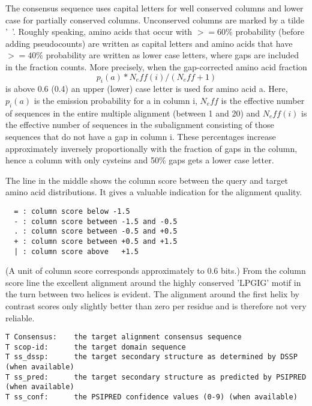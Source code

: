 \documentclass[11pt,a4paper]{article}
\begin{document}
The consensus sequence uses capital letters for well conserved columns and
lower case for partially conserved columns. Unconserved columns are marked by 
a tilde '~'. Roughly speaking, amino acids that occur with $>=60\%$ probability 
(before adding pseudocounts) are written as capital letters and amino acids that have 
$>=40\%$ probability are written as lower case letters, where gaps are included
in the fraction counts. More precisely, when the gap-corrected amino acid fraction
    \[p_i(a)*N_eff(i)/(N_eff+1)\]
is above 0.6 (0.4) an upper (lower) case letter is used for amino acid a.
Here, $p_i(a)$ is the emission probability for a in column i, $N_eff$ is the effective 
number of sequences in the entire multiple alignment (between 1 and 20) and $N_eff(i)$ is 
the effective number of sequences in the subalignment consisting of those sequences
that do not have a gap in column i. These percentages increase
approximately inversely proportionally with the fraction of gaps in the column, 
hence a column with only cysteins and 50\% gaps gets a lower case letter.
              
The line in the middle shows the column score between the query and target 
amino acid distributions. It gives a valuable indication for the alignment quality.
\small\begin{verbatim}
  = : column score below -1.5
  - : column score between -1.5 and -0.5
  . : column score between -0.5 and +0.5
  + : column score between +0.5 and +1.5
  | : column score above   +1.5
\end{verbatim}\normalsize

(A unit of column score corresponds approximately to 0.6 bits.)
From the column score line the excellent alignment around the highly conserved 
'LPGIG' motif in the turn between two helices is evident. The alignment around the 
first helix by contrast scores only slightly better than zero per residue and is
therefore not very reliable.

\small\begin{verbatim}
T Consensus:    the target alignment consensus sequence
T scop-id:      the target domain sequence
T ss_dssp:      the target secondary structure as determined by DSSP (when available)
T ss_pred:      the target secondary structure as predicted by PSIPRED (when available)
T ss_conf:      the PSIPRED confidence values (0-9) (when available)
\end{verbatim}\normalsize
\end{document}
